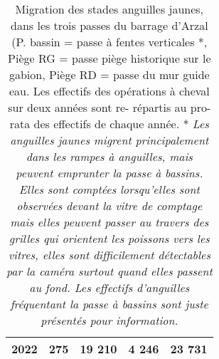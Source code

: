 \begin{table}[ht]
\begin{tabular}{lrrrr}
  2022 & 275 & 19 210 & 4 246 & 23 731 \\ 
   \hline
\end{tabular}
\caption{Migration des stades anguilles jaunes, dans les
				trois passes du barrage d'Arzal (P. bassin = passe à fentes verticales *, Piège RG = passe piège historique
				sur le gabion, Piège RD = passe du mur guide eau. Les effectifs des opérations à cheval sur deux années sont re-
				répartis au pro-rata des effectifs de chaque année. * \textit{ Les anguilles jaunes migrent principalement dans les rampes à anguilles, mais
				peuvent emprunter la passe à bassins. Elles sont comptées lorsqu'elles sont observées
				devant la vitre de comptage mais elles peuvent passer au travers des grilles qui
				orientent les poissons vers les vitres, elles sont difficilement détectables par
				la caméra surtout quand elles passent au fond. Les effectifs d'anguilles
				fréquentant la passe à bassins sont juste présentés pour information.}} 
\label{table_bilanannuel_ang}
\end{table}
